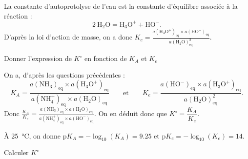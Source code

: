 
\begin{corrige}
La constante d'autoprotolyse de l'eau est la constante d'équilibre associée à la réaction : 
\[
2~\text{H}_2\text{O}=\text{H}_3\text{O}^+ + \text{HO}^-.
\]
D'après la loi d'action de masse, on a donc 
$K_e=\frac{a(\text{H}_3\text{O}^+)_\text{eq}\times a(\text{HO}^-)_\text{eq}}{a(\text{H}_2\text{O})^2_\text{eq}}$.
\end{corrige}



\hauteurLargeurCadreReponse		{8mm}{5cm}



\begin{enonce}
Donner l'expression de $K^\circ$ en fonction de $K_A$ et $K_e$
\end{enonce}


\begin{corrige}
On a, d'après les questions précédentes : \minusMedskip
\[
K_A=\frac{a(\text{NH}_3)_\text{eq}\times a(\text{H}_3\text{O}^+)_\text{eq}}{a(\text{NH}^+_4)_\text{eq}\times a(\text{H}_2\text{O})_\text{eq}}\qquad \text{et}\qquad K_e=\frac{a(\text{HO}^-)_\text{eq}\times a(\text{H}_3\text{O}^+)_\text{eq}}{a(\text{H}_2\text{O})^2_\text{eq}}.
\]
Donc $\frac{K_A}{K_e}=\frac{a(\text{NH}_3)_\text{eq}\times a(\text{H}_2\text{O})_\text{eq}}{a(\text{NH}^+_4)_\text{eq}\times a(\text{HO}^-)_\text{eq}}$. On en déduit donc que $K^\circ=\dfrac{K_A}{K_e}$.
\end{corrige}



\begin{enonce}
À \SI{25}{\celsius}, on donne $\mathrm{p}K_A=-\log_{10}(K_A)=\num{9,25}$ et $\mathrm{p}K_e=-\log_{10}(K_e)=14$. 

Calculer $K^\circ$
\end{enonce}


